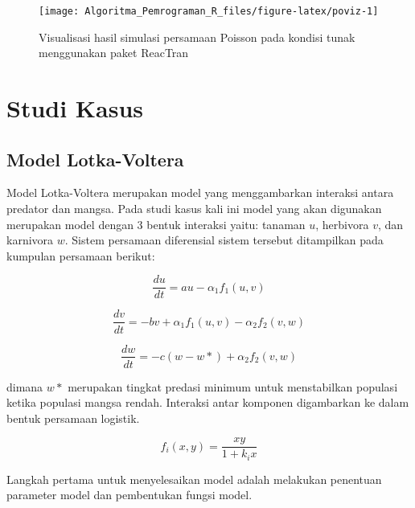 \documentclass[
]{book}
\theoremstyle{definition}
\theoremstyle{definition}
\theoremstyle{definition}
\theoremstyle{definition}
\theoremstyle{remark}
\begin{document}
\begin{figure}

{\centering \texttt{[image: Algoritma\_Pemrograman\_R\_files/figure-latex/poviz-1]} 

}

\caption{Visualisasi hasil simulasi persamaan Poisson pada kondisi tunak menggunakan paket ReacTran}\label{fig:poviz}
\end{figure}

\hypertarget{studi-kasus-3}{%
\section{Studi Kasus}\label{studi-kasus-3}}

\hypertarget{model-lotka-voltera}{%
\subsection{Model Lotka-Voltera}\label{model-lotka-voltera}}

Model Lotka-Voltera merupakan model yang menggambarkan interaksi antara predator dan mangsa. Pada studi kasus kali ini model yang akan digunakan merupakan model dengan 3 bentuk interaksi yaitu: tanaman \(u\), herbivora \(v\), dan karnivora \(w\). Sistem persamaan diferensial sistem tersebut ditampilkan pada kumpulan persamaan berikut:

\begin{equation}
\frac{du}{dt}=au-\alpha_1f_1\left(u,v\right)
  \label{eq:lv}
\end{equation}

\begin{equation}
\frac{dv}{dt}=-bv+\alpha_1f_1\left(u,v\right)-\alpha_2f_2\left(v,w\right)
  \label{eq:lv2}
\end{equation}

\begin{equation}
\frac{dw}{dt}=-c\left(w-w\ast\right)+\alpha_2f_2\left(v,w\right)
  \label{eq:lv3}
\end{equation}

dimana \(w\ast\) merupakan tingkat predasi minimum untuk menstabilkan populasi ketika populasi mangsa rendah. Interaksi antar komponen digambarkan ke dalam bentuk persamaan logistik.

\begin{equation}
f_i\left(x,y\right)=\frac{xy}{1+k_ix}
  \label{eq:lv4}
\end{equation}

Langkah pertama untuk menyelesaikan model adalah melakukan penentuan parameter model dan pembentukan fungsi model.
\end{document}

